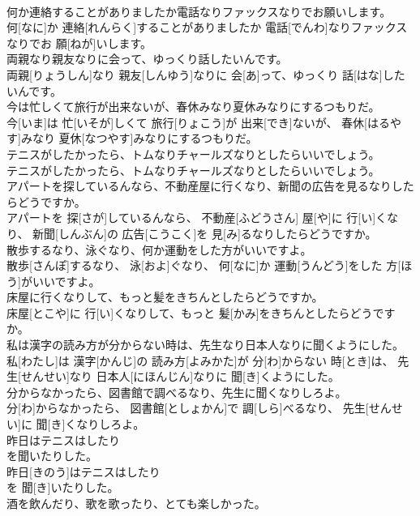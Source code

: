 \documentclass[8pt]{extreport}
\begin{document}
\begin{CJK}{UTF8}{min}
\\	何か連絡することがありましたか電話なりファックスなりでお願いします。	
\\	何[なに]か 連絡[れんらく]することがありましたか 電話[でんわ]なりファックスなりでお 願[ねが]いします。
\\	両親なり親友なりに会って、ゆっくり話したいんです。	
\\	両親[りょうしん]なり 親友[しんゆう]なりに 会[あ]って、ゆっくり 話[はな]したいんです。
\\	今は忙しくて旅行が出来ないが、春休みなり夏休みなりにするつもりだ。	
\\	今[いま]は 忙[いそが]しくて 旅行[りょこう]が 出来[でき]ないが、 春休[はるやす]みなり 夏休[なつやす]みなりにするつもりだ。
\\	テニスがしたかったら、トムなりチャールズなりとしたらいいでしょう。	
\\	テニスがしたかったら、トムなりチャールズなりとしたらいいでしょう。
\\	アパートを探しているんなら、不動産屋に行くなり、新聞の広告を見るなりしたらどうですか。	
\\	アパートを 探[さが]しているんなら、 不動産[ふどうさん] 屋[や]に 行[い]くなり、 新聞[しんぶん]の 広告[こうこく]を 見[み]るなりしたらどうですか。
\\	散歩するなり、泳ぐなり、何か運動をした方がいいですよ。	
\\	散歩[さんぽ]するなり、 泳[およ]ぐなり、 何[なに]か 運動[うんどう]をした 方[ほう]がいいですよ。
\\	床屋に行くなりして、もっと髪をきちんとしたらどうですか。	
\\	床屋[とこや]に 行[い]くなりして、もっと 髪[かみ]をきちんとしたらどうですか。
\\	私は漢字の読み方が分からない時は、先生なり日本人なりに聞くようにした。	
\\	私[わたし]は 漢字[かんじ]の 読み方[よみかた]が 分[わ]からない 時[とき]は、 先生[せんせい]なり 日本人[にほんじん]なりに 聞[き]くようにした。
\\	分からなかったら、図書館で調べるなり、先生に聞くなりしろよ。	
\\	分[わ]からなかったら、 図書館[としょかん]で 調[しら]べるなり、 先生[せんせい]に 聞[き]くなりしろよ。
\\	昨日はテニスはしたり
\\	を聞いたりした。	
\\	昨日[きのう]はテニスはしたり 
\\	を 聞[き]いたりした。
\\	酒を飲んだり、歌を歌ったり、とても楽しかった。	

\end{CJK}
\end{document}
